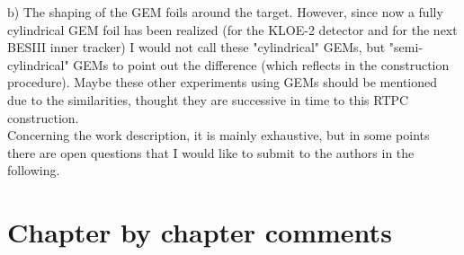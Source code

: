 \documentclass[a4paper,11pt,twoside]{article}
\begin{document}
b) The shaping of the GEM foils around the target. However, since now a fully 
cylindrical GEM foil has been realized (for the KLOE-2 detector and for the 
next BESIII inner tracker) I would not call these "cylindrical" GEMs, but 
"semi-cylindrical" GEMs to point out the difference (which reflects in the 
construction procedure). Maybe these other experiments using GEMs should be 
mentioned due to the similarities, thought they are successive in time to this 
RTPC construction.\\ 

Concerning the work description, it is mainly exhaustive, but in some points 
there are open questions that I would like to submit to the authors in the 
following.

\newpage
\section*{Chapter by chapter comments}
\end{document}
